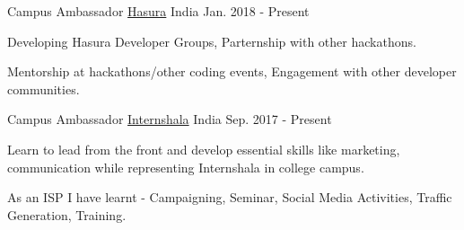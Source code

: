 
\begin{cventries}

  \cventry
    {Campus Ambassador} %
    {\href{http://hasura.io}{Hasura}} %
    {India} %
    {Jan. 2018 - Present} %
    {
      \begin{cvitems} %
        \item {Developing Hasura Developer Groups, Parternship with other hackathons.}
        \item {Mentorship at hackathons/other coding events, Engagement with other developer communities.}
      \end{cvitems}
    }

  \cventry
    {Campus Ambassador} %
    {\href{https://internshala.com/}{Internshala}} %
    {India} %
    {Sep. 2017 - Present} %
    {
      \begin{cvitems} %
        \item {Learn to lead from the front and develop essential skills like marketing, communication while representing Internshala in college campus. }
        \item {As an ISP I have learnt - Campaigning, Seminar, Social Media Activities, Traffic Generation, Training.}
      \end{cvitems}
    }


\end{cventries}
